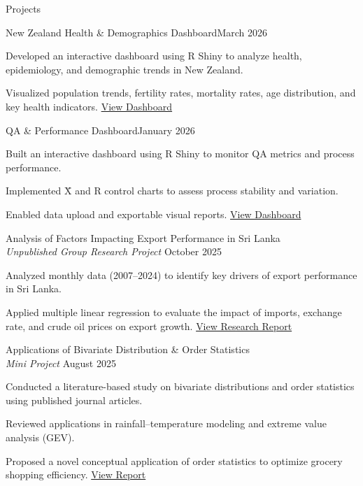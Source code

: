 \documentclass{resume} %
\begin{document}
\begin{rSection}{Projects}

\begin{rSubsection}{New Zealand Health \& Demographics Dashboard}{March 2026}{}{}
\item Developed an interactive dashboard using R Shiny to analyze health, epidemiology, and demographic trends in New Zealand.
\item Visualized population trends, fertility rates, mortality rates, age distribution, and key health indicators. \href{https://hiruniherath.shinyapps.io/Rshiny_app_NewZealand_health_dashboard/}{View Dashboard}
\end{rSubsection}

\begin{rSubsection}{QA \& Performance Dashboard}{January 2026 }{}{}
\item Built an interactive dashboard using R Shiny to monitor QA metrics and process performance.
\item Implemented \={X} and R control charts to assess process stability and variation.
\item Enabled data upload and exportable visual reports.
\href{https://hiruniherath.shinyapps.io/Downloads/}{View Dashboard}
\end{rSubsection}

\begin{rSubsection}{
Analysis of Factors Impacting Export Performance in Sri Lanka\\
{\small\textit{Unpublished Group Research Project}}
}{October 2025}{}{}
\item Analyzed monthly data (2007–2024) to identify key drivers of export performance in Sri Lanka.
\item Applied multiple linear regression to evaluate the impact of imports, exchange rate, and crude oil prices on export growth.
\href{https://drive.google.com/file/d/1z7Mu97fLYHxbJ5bMiPOJsT1EK2aqRTsy/view}{View Research Report}
\end{rSubsection}

\begin{rSubsection}{
Applications of Bivariate Distribution \& Order Statistics\\
{\small\textit{Mini Project}}
}{August 2025}{}{}
\item Conducted a literature-based study on bivariate distributions and order statistics using published journal articles.
\item Reviewed applications in rainfall–temperature modeling and extreme value analysis (GEV).
\item Proposed a novel conceptual application of order statistics to optimize grocery shopping efficiency.
\href{https://drive.google.com/file/d/1ztKpnNdySo7BiQfbNkcDytvZhxpFplL6/view}{View Report}
\end{rSubsection}

\end{rSection}
\end{document}
